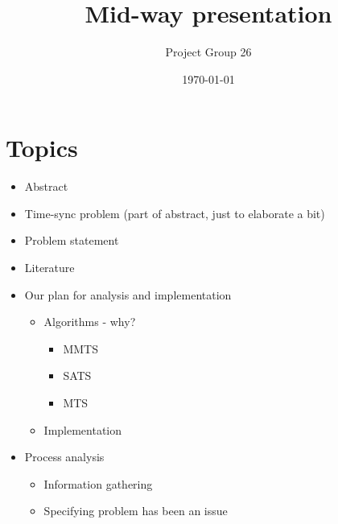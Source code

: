\documentclass{article}
\title{Mid-way presentation}
\author{Project Group 26}
\date{\today}
\begin{document}
\maketitle

\section{Topics}

\begin{itemize}
    \item Abstract
    \item Time-sync problem (part of abstract, just to elaborate a bit)
    \item Problem statement
    \item Literature
    \item Our plan for analysis and implementation
    \begin{itemize}
        \item Algorithms - why?
        \begin{itemize}
            \item MMTS
            \item SATS
            \item MTS
        \end{itemize}
        \item Implementation
    \end{itemize}
    \item Process analysis
    \begin{itemize}
        \item Information gathering
        \item Specifying problem has been an issue
        \end{itemize}
\end{itemize}
\end{document}
